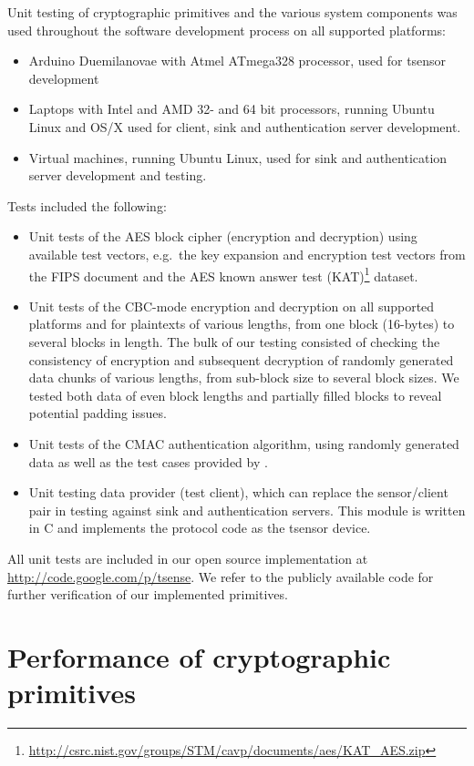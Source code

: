 Unit testing of cryptographic primitives and the various system components was used throughout the software development process on all supported platforms:
\begin{itemize}
\item Arduino Duemilanovae with Atmel ATmega328 processor, used for tsensor development
\item Laptops with Intel and AMD 32- and 64 bit processors, running Ubuntu Linux and OS/X used for client, sink and authentication server development.
\item Virtual machines, running Ubuntu Linux, used for sink and authentication server development and testing.
\end{itemize}
%
Tests included the following:
%
\begin{itemize}
\item Unit tests of the AES block cipher (encryption and decryption) using available test vectors, e.g.\ the key expansion and encryption test vectors from the FIPS  document and the AES known answer test (KAT)\footnote{\url{http://csrc.nist.gov/groups/STM/cavp/documents/aes/KAT_AES.zip}} dataset.
\item Unit tests of the CBC-mode encryption and decryption on all supported platforms and for plaintexts of various lengths, from one block (16-bytes) to several blocks in length. The bulk of our testing consisted of checking the consistency of encryption and subsequent decryption of randomly generated data chunks of various lengths, from sub-block size to several block sizes. We tested both data of even block lengths and partially filled blocks to reveal potential padding issues.
\item Unit tests of the CMAC authentication algorithm, using randomly generated data as well as the test cases provided by .
\item Unit testing data provider (test client), which can replace the sensor/client pair in testing against sink and authentication servers. This module is written in C and implements the protocol code as the tsensor device.
\end{itemize}
All unit tests are included in our open source implementation at \url{http://code.google.com/p/tsense}. We refer to the publicly available code for further verification of our implemented primitives.

\section{Performance of cryptographic primitives}

